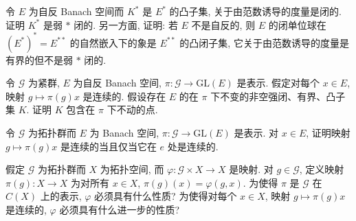\documentclass[../../main.tex]{subfiles}
\begin{document}
\begin{exercise}\label{exercise:ch22-15}
令 $E$ 为自反 Banach 空间而 $K^{*}$ 是 $E^{*}$ 的凸子集, 关于由范数诱导的度量是闭的. 证明 $K^{*}$ 是弱 $*$ 闭的. 另一方面, 证明: 若 $E$ 不是自反的, 则 $E$ 的闭单位球在 $(E^{*})^{*}=E^{**}$ 的自然嵌入下的象是 $E^{**}$ 的凸闭子集, 它关于由范数诱导的度量是有界的但不是弱 $*$ 闭的.
\end{exercise}

\begin{exercise}\label{exercise:ch22-16}
令 $\mathcal{G}$ 为紧群, $E$ 为自反 Banach 空间, $\pi:\mathcal{G}\to\mathrm{GL}(E)$ 是表示. 假定对每个 $x\in E$, 映射 $g\mapsto\pi(g)x$ 是连续的. 假设存在 $E$ 的在 $\pi$ 下不变的非空强闭、有界、凸子集 $K$. 证明 $K$ 包含在 $\pi$ 下不动的点.
\end{exercise}

\begin{exercise}\label{exercise:ch22-17}
令 $\mathcal{G}$ 为拓扑群而 $E$ 为 Banach 空间, $\pi:\mathcal{G}\to\mathrm{GL}(E)$ 是表示. 对 $x\in E$, 证明映射 $g\mapsto\pi(g)x$ 是连续的当且仅当它在 $e$ 处是连续的.
\end{exercise}

\begin{exercise}\label{exercise:ch22-18}
假定 $\mathcal{G}$ 为拓扑群而 $X$ 为拓扑空间, 而 $\varphi:\mathcal{G}\times X\to X$ 是映射. 对 $g\in\mathcal{G}$, 定义映射 $\pi(g):X\to X$ 为对所有 $x\in X$, $\pi(g)(x)=\varphi(g,x)$. 为使得 $\pi$ 是 $\mathcal{G}$ 在 $C(X)$ 上的表示, $\varphi$ 必须具有什么性质? 为使得对每个 $x\in X$, 映射 $g\mapsto\pi(g)x$ 是连续的, $\varphi$ 必须具有什么进一步的性质?
\end{exercise}
\end{document}
